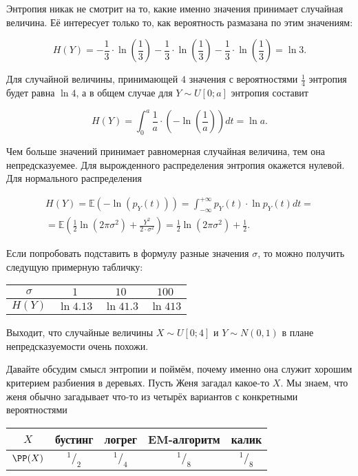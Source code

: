 \documentclass[12pt,a4paper]{article}
\begin{document}
\begin{esSolution}
Энтропия никак не смотрит на то, какие именно значения принимает случайная величина. Её интересует только то, как вероятность размазана по этим значениям:

\[ 
    H(Y) = 
    - \frac{1}{3} \cdot \ln \left(\frac{1}{3}\right)
    - \frac{1}{3} \cdot \ln \left(\frac{1}{3}\right) 
    - \frac{1}{3} \cdot \ln \left(\frac{1}{3}\right) 
    = \ln 3.
\] 

Для случайной величины, принимающей $4$ значения с вероятностями $\frac{1}{4}$ энтропия будет равна $\ln 4$, а в общем случае для $Y \sim U[0;a]$ энтропия составит 

\[
    H(Y) = \int_0^a \frac{1}{a} \cdot \left(- \ln\left(\frac{1}{a}\right) \right) dt 
    = \ln a. 
\]

Чем больше значений принимает равномерная случайная величина, тем она непредсказуемее.  Для вырожденного распределения энтропия окажется нулевой. Для нормального распределения

\begin{multline*}
    H(Y) = \mathbb{E}( - \ln(p_Y(t)))  = \int_{-\infty}^{+\infty} p_Y(t) \cdot \ln p_Y(t) dt = \\ = \mathbb{E} \left(\frac{1}{2} \ln(2 \pi \sigma^2 ) + \frac{Y^2}{2\cdot \sigma^2}\right) = \frac{1}{2} \ln(2 \pi \sigma^2) + \frac{1}{2}.
\end{multline*} 

Если попробовать подставить в формулу разные значения $\sigma$, то можно получить следущую примерную табличку: 

\begin{center}
\begin{tabular}{c|c|c|c}
    $\sigma$ & $1$ & $10$  &  $100$  \\ \hline
    $H(Y)$ & $\ln 4.13 $ & $\ln 41.3 $  & $\ln 413 $
\end{tabular}
\end{center}

Выходит, что случайные величины $X \sim U[0;4]$ и $Y \sim N(0,1)$ в плане непредсказуемости очень похожи.
\end{esSolution}

Давайте обсудим смысл энтропии и поймём, почему именно она служит хорошим критерием разбиения в деревьях. Пусть Женя загадал какое-то $X.$ Мы знаем, что женя обычно загадывает что-то из четырёх вариантов с конкретными вероятностями

\begin{center}
    \begin{tabular}{c|c|c|c|c}
        $X$ & бустинг & логрег &  EM-алгоритм & калик   \\ \hline
        $\PP(X)$ & $^1/_2$ & $^1/_4 $  & $^1/_8$ & $^1/_8$
    \end{tabular}
\end{center}
\end{document}
